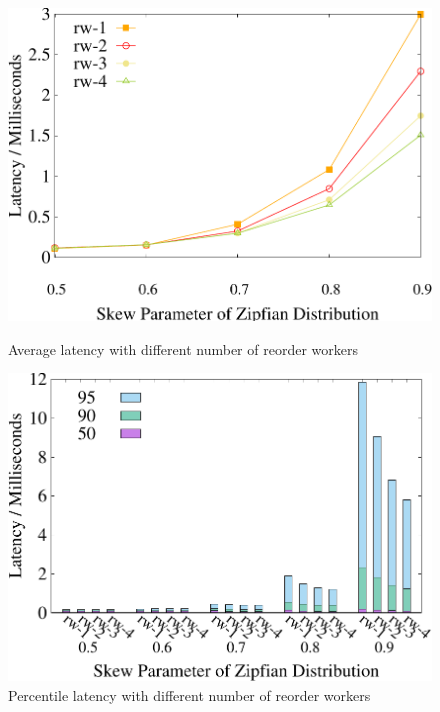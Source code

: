 \begin{figure}[t]
    \centering
	\begin{minipage}[b]{0.32\linewidth}
	\centering
	\includegraphics[width=\textwidth]{./exp_fig/reorder/latency}
	\vspace{-2em}
	\caption{Average latency with different number of reorder workers}
	\label{fig:reorder:latency}
	\end{minipage}    
    \begin{minipage}[b]{0.32\linewidth}
	\centering
	\includegraphics[width=\textwidth]{./exp_fig/reorder/percent95_latency}
	\vspace{-2em}
	\caption{Percentile latency with different number of reorder workers}
	\label{fig:reorder:p95}
	\end{minipage}    

\end{figure}
